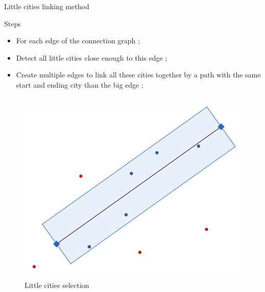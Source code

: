 \begin{frame}{Little cities linking method}
    \begin{block}{Steps}
        \begin{itemize}
            \item For each edge of the connection graph ;
            \item Detect all little cities close enough to this edge ;
            \item Create multiple edges to link all these cities together by a path with the same start and ending city than the big edge ;
        \end{itemize}
    \end{block}
    \begin{columns}
        \begin{column}{0.5\paperwidth}
            \begin{figure}
                \includegraphics[height=0.3\paperheight]{images/road_detection/illustartion_city_selections.png}
                \caption{Little cities selection}
            \end{figure}
        \end{column}
        

\end{columns}
\end{frame}
